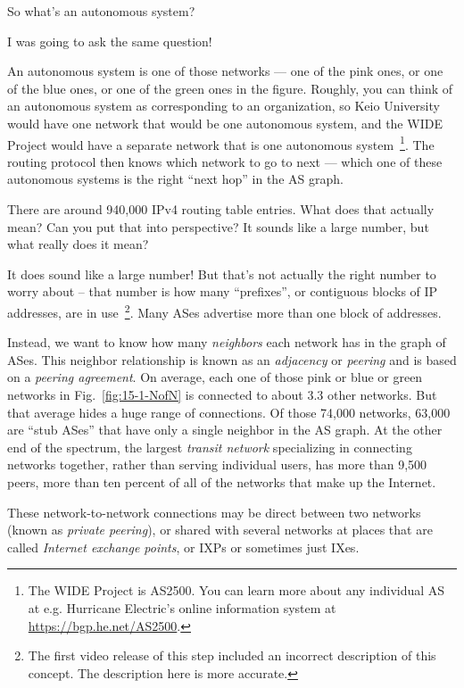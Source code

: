 \rrr So what's an autonomous system?

\mmm I was going to ask the same question!

\rrr An autonomous system is one of those networks --- one of the pink ones, or one of the blue ones, or one of the green ones in the figure. Roughly, you can think of an autonomous system as corresponding to an organization, so Keio University would have one network that would be one autonomous system, and the WIDE Project would have a separate network that is one autonomous system~\footnote{The WIDE Project is AS2500. You can learn more about any individual AS at e.g. Hurricane Electric's online information system at \url{https://bgp.he.net/AS2500}.}. The routing protocol then knows which network to go to next --- which one of these autonomous systems is the right ``next hop'' in the AS graph.

\mmm There are around 940,000 IPv4 routing table entries. What does that actually mean? Can you put that into perspective? It sounds like a large number, but what really does it mean?

\rrr It does sound like a large number! But that's not actually the right number to worry about -- that number is how many ``prefixes'', or contiguous blocks of IP addresses, are in use~\footnote{The first video release of this step included an incorrect description of this concept. The description here is more accurate.}.  Many ASes advertise more than one block of addresses.

Instead, we want to know how many \emph{neighbors} each network has in the graph of ASes.  This neighbor relationship is known as an \emph{adjacency} or \emph{peering} and is based on a \emph{peering agreement}.
On average, each one of those pink or blue or green networks in Fig.~\ref{fig:15-1-NofN} is connected to about 3.3 other networks. But that average hides a huge range of connections. Of those 74,000 networks, 63,000 are ``stub ASes'' that have only a single neighbor in the AS graph. At the other end of the spectrum, the largest \emph{transit network} specializing in connecting networks together, rather than serving individual users, has more than 9,500 peers, more than ten percent of all of the networks that make up the Internet.

These network-to-network connections may be direct between two networks (known as \emph{private peering}), or shared with several networks at places that are called \emph{Internet exchange points}, or IXPs or sometimes just IXes.

